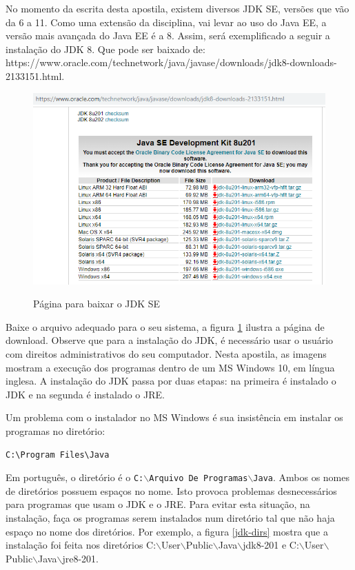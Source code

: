 \documentclass[
	12pt,				%
	twoside,			%
	a4paper,			%
	english,			%
	french,				%
	spanish,			%
	brazil				%
	]{abntex2}
\begin{document}
No momento da escrita desta apostila, existem diversos JDK SE, versões que vão da 6 a 11. Como uma extensão da disciplina, vai levar ao uso do Java EE, a versão mais avançada do Java EE é a 8. Assim, será exemplificado a seguir a instalação do JDK 8. Que pode ser baixado de:
https://www.oracle.com/technetwork/java/javase/downloads/jdk8-downloads-2133151.html.

\begin{figure}[h]
\begin{center}
\includegraphics[scale=0.5]{jdk-download.png} 
\caption{Página para baixar o JDK SE}
\label{fig:jdk-download}
\end{center}
\end{figure}

Baixe o arquivo adequado para o seu sistema, a figura \ref{fig:jdk-download} ilustra a página de download. Observe que para a instalação do JDK, é necessário usar o usuário com direitos administrativos do seu computador. Nesta apostila, as imagens mostram a execução dos programas dentro de um MS Windows 10, em língua inglesa. A instalação do JDK passa por duas etapas: na primeira é instalado o JDK e na segunda é instalado o JRE.

Um problema com o instalador no MS Windows é sua insistência em instalar os programas no diretório:
\begin{verbatim}
C:\Program Files\Java
\end{verbatim}

Em português, o diretório é o \texttt{C:$\backslash$Arquivo De Programas$\backslash$Java}. Ambos os nomes de diretórios possuem espaços no nome. Isto provoca problemas desnecessários para programas que usam o JDK e o JRE. Para evitar esta situação, na instalação, faça os programas serem instalados num diretório tal que não haja espaço no nome dos diretórios. Por exemplo, a figura \ref{jdk-dirs} mostra que a instalação foi feita nos diretórios C:$\backslash$User$\backslash$Public$\backslash$Java$\backslash$jdk8-201 e C:$\backslash$User$\backslash$Public$\backslash$Java$\backslash$jre8-201.
\end{document}
